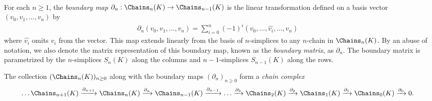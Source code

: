 \


For each $n\geq 1$, the \textit{boundary map} $\partial_n: \Chains_n(K) \rightarrow \Chains_{n-1}(K)$ is the linear transformation defined on a basis vector  $(v_0, v_1, \ldots, v_n)$ by 
    \begin{align*}
    \textstyle
        \partial_n(v_0, v_1, \ldots, v_n) = \sum_{i=0}^n (-1)^i (v_0, \ldots, \hat{v_i}, \ldots, v_n)
    \end{align*}
where $\hat{v_i}$ omits $v_i$ from the vector. This map extends linearly from the basis of $n$-simplices to any $n$-chain in $\Chains_n(K)$. By an abuse of notation, we also denote the matrix representation of this boundary map, known as the \textit{boundary matrix}, as $\partial_n$. The boundary matrix is parametrized by the $n$-simplices $S_n(K)$ along the columns and $n-1$-simplices $S_{n-1}(K)$ along the rows. 




The collection  $(\Chains_n(K))_{n\geq 0}$ along with the boundary maps $(\partial_n)_{n\geq 0}$ form a \textit{chain complex}
\[\ldots \Chains_{n+1}(K) \xrightarrow{\partial_{n+1}} \Chains_{n}(K) \xrightarrow{\partial_{n}} \Chains_{n-1}(K) \xrightarrow{\partial_{n-1}} \ldots \xrightarrow{\partial_3} \Chains_2(K) \xrightarrow{\partial_2} \Chains_1(K) \xrightarrow{\partial_1} \Chains_0(K) \xrightarrow{\partial_0} 0. \]


